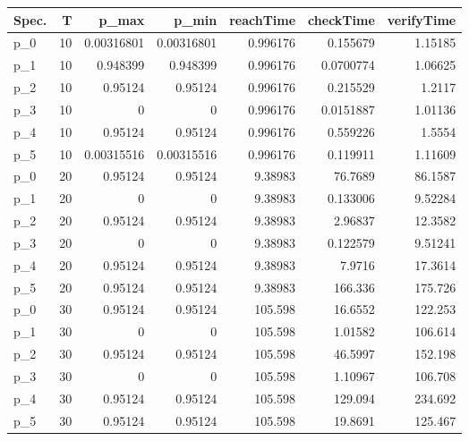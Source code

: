 \begin{tabular}{lrrrrrr}
\hline
 Spec.   &   T &      p\_max &      p\_min &   reachTime &   checkTime &   verifyTime \\
\hline
 p\_0     &  10 & 0.00316801 & 0.00316801 &    0.996176 &   0.155679  &      1.15185 \\
 p\_1     &  10 & 0.948399   & 0.948399   &    0.996176 &   0.0700774 &      1.06625 \\
 p\_2     &  10 & 0.95124    & 0.95124    &    0.996176 &   0.215529  &      1.2117  \\
 p\_3     &  10 & 0          & 0          &    0.996176 &   0.0151887 &      1.01136 \\
 p\_4     &  10 & 0.95124    & 0.95124    &    0.996176 &   0.559226  &      1.5554  \\
 p\_5     &  10 & 0.00315516 & 0.00315516 &    0.996176 &   0.119911  &      1.11609 \\
 p\_0     &  20 & 0.95124    & 0.95124    &    9.38983  &  76.7689    &     86.1587  \\
 p\_1     &  20 & 0          & 0          &    9.38983  &   0.133006  &      9.52284 \\
 p\_2     &  20 & 0.95124    & 0.95124    &    9.38983  &   2.96837   &     12.3582  \\
 p\_3     &  20 & 0          & 0          &    9.38983  &   0.122579  &      9.51241 \\
 p\_4     &  20 & 0.95124    & 0.95124    &    9.38983  &   7.9716    &     17.3614  \\
 p\_5     &  20 & 0.95124    & 0.95124    &    9.38983  & 166.336     &    175.726   \\
 p\_0     &  30 & 0.95124    & 0.95124    &  105.598    &  16.6552    &    122.253   \\
 p\_1     &  30 & 0          & 0          &  105.598    &   1.01582   &    106.614   \\
 p\_2     &  30 & 0.95124    & 0.95124    &  105.598    &  46.5997    &    152.198   \\
 p\_3     &  30 & 0          & 0          &  105.598    &   1.10967   &    106.708   \\
 p\_4     &  30 & 0.95124    & 0.95124    &  105.598    & 129.094     &    234.692   \\
 p\_5     &  30 & 0.95124    & 0.95124    &  105.598    &  19.8691    &    125.467   \\
\hline
\end{tabular}
